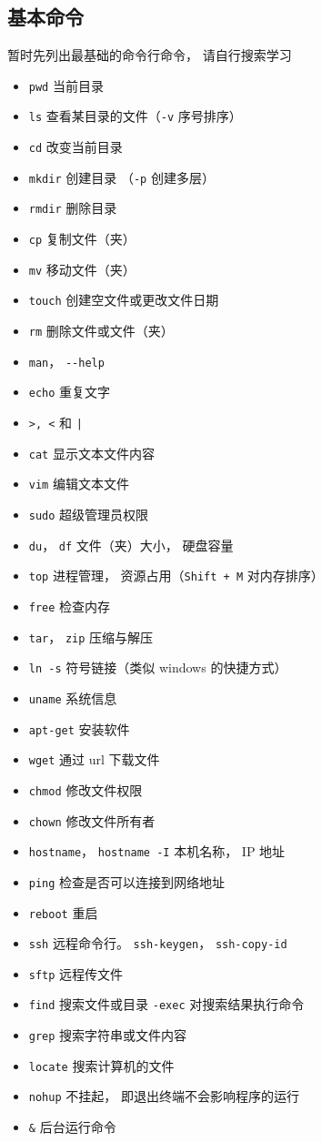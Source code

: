 \subsection{基本命令}
暂时先列出最基础的命令行命令， 请自行搜索学习
\begin{itemize}
\item \verb`pwd` 当前目录
\item \verb`ls` 查看某目录的文件（\verb`-v` 序号排序）
\item \verb`cd` 改变当前目录
\item \verb`mkdir` 创建目录 （\verb`-p` 创建多层）
\item \verb`rmdir` 删除目录
\item \verb`cp` 复制文件（夹）
\item \verb`mv` 移动文件（夹）
\item \verb`touch` 创建空文件或更改文件日期
\item \verb`rm` 删除文件或文件（夹）
\item \verb`man`， \verb`--help`
\item \verb`echo` 重复文字
\item \verb`>, <` 和 \verb`|`
\item \verb`cat` 显示文本文件内容
\item \verb`vim` 编辑文本文件
\item \verb`sudo` 超级管理员权限
\item \verb`du`， \verb`df` 文件（夹）大小， 硬盘容量
\item \verb`top` 进程管理， 资源占用（\verb`Shift + M` 对内存排序）
\item \verb`free` 检查内存
\item \verb`tar`， \verb`zip` 压缩与解压
\item \verb`ln -s` 符号链接（类似 windows 的快捷方式）
\item \verb`uname` 系统信息
\item \verb`apt-get` 安装软件
\item \verb`wget` 通过 url 下载文件
\item \verb`chmod` 修改文件权限
\item \verb`chown` 修改文件所有者
\item \verb`hostname`， \verb`hostname -I` 本机名称， IP 地址
\item \verb`ping` 检查是否可以连接到网络地址
\item \verb`reboot` 重启
\item \verb`ssh` 远程命令行。 \verb`ssh-keygen`， \verb`ssh-copy-id`
\item \verb`sftp` 远程传文件
\item \verb`find` 搜索文件或目录 \verb`-exec` 对搜索结果执行命令
\item \verb`grep` 搜索字符串或文件内容
\item \verb`locate` 搜索计算机的文件
\item \verb`nohup` 不挂起， 即退出终端不会影响程序的运行
\item \verb`&` 后台运行命令
\end{itemize}

